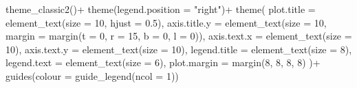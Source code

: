 \documentclass[
  letterpaper,
  DIV=11,
  numbers=noendperiod]{scrreprt}
\newenvironment{Shaded}{\begin{snugshade}}{\end{snugshade}}
\newcommand{\AttributeTok}[1]{\textcolor[rgb]{0.40,0.45,0.13}{#1}}
\newcommand{\DecValTok}[1]{\textcolor[rgb]{0.68,0.00,0.00}{#1}}
\newcommand{\FloatTok}[1]{\textcolor[rgb]{0.68,0.00,0.00}{#1}}
\newcommand{\FunctionTok}[1]{\textcolor[rgb]{0.28,0.35,0.67}{#1}}
\newcommand{\NormalTok}[1]{\textcolor[rgb]{0.00,0.23,0.31}{#1}}
\newcommand{\SpecialCharTok}[1]{\textcolor[rgb]{0.37,0.37,0.37}{#1}}
\newcommand{\StringTok}[1]{\textcolor[rgb]{0.13,0.47,0.30}{#1}}
\begin{document}
\begin{Shaded}
\begin{Highlighting}[]
  \FunctionTok{theme\_classic2}\NormalTok{()}\SpecialCharTok{+}
  \FunctionTok{theme}\NormalTok{(}\AttributeTok{legend.position =} \StringTok{"right"}\NormalTok{)}\SpecialCharTok{+}
  \FunctionTok{theme}\NormalTok{(}
    \AttributeTok{plot.title =} \FunctionTok{element\_text}\NormalTok{(}\AttributeTok{size =} \DecValTok{10}\NormalTok{, }\AttributeTok{hjust =} \FloatTok{0.5}\NormalTok{),}
    \AttributeTok{axis.title.y =} \FunctionTok{element\_text}\NormalTok{(}\AttributeTok{size =} \DecValTok{10}\NormalTok{, }\AttributeTok{margin =} \FunctionTok{margin}\NormalTok{(}\AttributeTok{t =} \DecValTok{0}\NormalTok{, }\AttributeTok{r =} \DecValTok{15}\NormalTok{, }\AttributeTok{b =} \DecValTok{0}\NormalTok{, }\AttributeTok{l =} \DecValTok{0}\NormalTok{)),}
    \AttributeTok{axis.text.x =} \FunctionTok{element\_text}\NormalTok{(}\AttributeTok{size =} \DecValTok{10}\NormalTok{),}
    \AttributeTok{axis.text.y =} \FunctionTok{element\_text}\NormalTok{(}\AttributeTok{size =} \DecValTok{10}\NormalTok{),}
    \AttributeTok{legend.title =} \FunctionTok{element\_text}\NormalTok{(}\AttributeTok{size =} \DecValTok{8}\NormalTok{),}
    \AttributeTok{legend.text =} \FunctionTok{element\_text}\NormalTok{(}\AttributeTok{size =} \DecValTok{6}\NormalTok{),}
    \AttributeTok{plot.margin =} \FunctionTok{margin}\NormalTok{(}\DecValTok{8}\NormalTok{, }\DecValTok{8}\NormalTok{, }\DecValTok{8}\NormalTok{, }\DecValTok{8}\NormalTok{)}
\NormalTok{  )}\SpecialCharTok{+}
  \FunctionTok{guides}\NormalTok{(}\AttributeTok{colour =} \FunctionTok{guide\_legend}\NormalTok{(}\AttributeTok{ncol =} \DecValTok{1}\NormalTok{))}
\end{Highlighting}
\end{Shaded}
\end{document}
